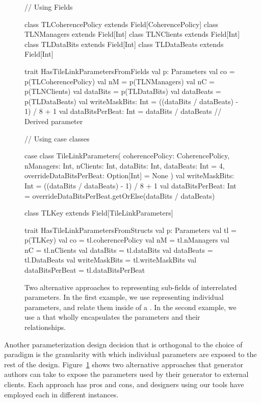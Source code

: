 \begin{figure}
\centering
\begin{scala}
// Using Fields

class TLCoherencePolicy extends Field[CoherencePolicy]
class TLNManagers extends Field[Int]
class TLNClients extends Field[Int]
class TLDataBits extends Field[Int]
class TLDataBeats extends Field[Int]

trait HasTileLinkParametersFromFields {
  val p: Parameters
  val co = p(TLCoherencePolicy)
  val nM = p(TLNManagers)
  val nC = p(TLNClients)
  val dataBits = p(TLDataBits)
  val dataBeats = p(TLDataBeats)
  val writeMaskBits: Int = ((dataBits / dataBeats) - 1) / 8 + 1
  val dataBitsPerBeat: Int = dataBits / dataBeats // Derived parameter
}

// Using case classes

case class TileLinkParameters(
    coherencePolicy: CoherencePolicy,
    nManagers: Int,
    nClients: Int,
    dataBits: Int,
    dataBeats: Int = 4,
    overrideDataBitsPerBeat: Option[Int] = None
    ) {
  val writeMaskBits: Int  = ((dataBits / dataBeats) - 1) / 8 + 1
  val dataBitsPerBeat: Int = overrideDataBitsPerBeat.getOrElse(dataBits / dataBeats)
}

class TLKey extends Field[TileLinkParameters]

trait HasTileLinkParametersFromStructs {
  val p: Parameters
  val tl = p(TLKey)
  val co = tl.coherencePolicy
  val nM = tl.nManagers
  val nC = tl.nClients
  val dataBits = tl.dataBits
  val dataBeats = tl.DataBeats
  val writeMaskBits = tl.writeMaskBits
  val dataBitsPerBeat = tl.dataBitsPerBeat
}
  
\end{scala} 
\caption[Two alternative approaches to representing sub-fields.]{
Two alternative approaches to representing sub-fields of interrelated parameters.
In the first example, we use  representing individual parameters, and relate them inside of a .
In the second example, we use a  that wholly encapsulates the parameters and their relationships.
}
\label{fig:fields}
\end{figure}

Another parameterization design decision that is orthogonal to the choice of paradigm is
the granularity with which individual parameters are exposed to the rest of the design.
Figure~\ref{fig:fields} shows two alternative approaches that generator authors can take to expose
the parameters used by their generator to external clients.
Each approach has pros and cons, and designers using our tools have employed each in different instances.

